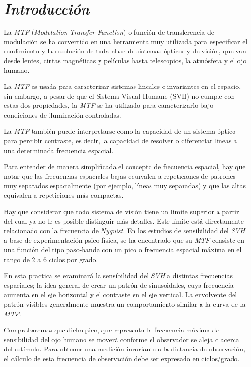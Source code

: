 \documentclass[conference]{IEEEtran}
\begin{document}
\section{\textit{Introducción}}

La \textit{MTF} (\textit{Modulation Transfer Function}) o función de transferencia de modulación se ha convertido en una herramienta muy utilizada para especificar el rendimiento y la resolución de toda clase de sistemas ópticos y de visión, que van desde lentes, cintas magnéticas y películas hasta telescopios, la atmósfera y el ojo humano.

La \textit{MTF} es usada para caracterizar sistemas lineales e invariantes en el espacio, sin embargo, a pesar de que el Sistema Visual Humano (SVH) no cumple con estas dos propiedades, la \textit{MTF} se ha utilizado para caracterizarlo bajo condiciones de iluminación controladas.

La \textit{MTF} también puede interpretarse como la capacidad de un sistema óptico para percibir contraste, es decir, la capacidad de resolver o diferenciar líneas a una determinada frecuencia espacial.

Para entender de manera simplificada el concepto de frecuencia espacial, hay que notar que las frecuencias espaciales bajas equivalen a repeticiones de patrones muy separados espacialmente (por ejemplo, líneas muy separadas) y que las altas equivalen a repeticiones más compactas.

Hay que considerar que todo sistema de visión tiene un límite superior a partir del cual ya no le es posible distinguir más detalles. Este límite está directamente relacionado con la frecuencia de \textit{Nyquist}\cite{p4}. En los estudios de sensibilidad del \textit{SVH} a base de experimentación psico-física, se ha encontrado que su \textit{MTF} consiste en una función del tipo paso-banda con un pico o frecuencia espacial máxima en el rango de 2 a 6 ciclos por grado\cite{p1}\cite{p2}.

En esta practica se examinará la sensibilidad del \textit{SVH} a distintas frecuencias espaciales; la idea general de crear un patrón de sinusoidales, cuya frecuencia aumenta en el eje horizontal y el contraste en el eje vertical. La envolvente del patrón visibles generalmente muestra un comportamiento similar a la curva de la \textit{MTF}.

Comprobaremos que dicho pico, que representa la frecuencia máxima de sensibilidad del ojo humano se moverá conforme el observador se aleja o acerca del estímulo. Para obtener una medición invariante a la distancia de observación, el cálculo de esta frecuencia de observación debe ser expresado en ciclos/grado.
\end{document}
